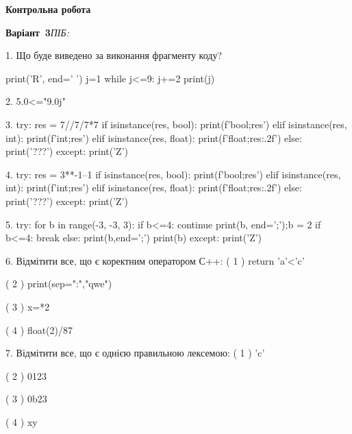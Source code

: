 \documentclass[11pt]{article}
\begin{document}
{\large\textbf{Контрольна робота}}

\textbf{Варіант \No\,3}\hfill \textit{ПІБ:}\,\underline{\hspace{60mm}}
\vspace{4mm}

1. Що буде виведено за виконання фрагменту коду?

print('R', end=' ')
j=1
while j<=9:
    j+=2
print(j)

\vspace{5mm}

2. 
5.0<="9.0j"\vspace{5mm}

3. 
try:
    res = 7//7/7*7
    if isinstance(res, bool):
        print(f'bool;{res}')
    elif isinstance(res, int):
        print(f'int;{res}')
    elif isinstance(res, float):
        print(f'float;{res:.2f}')
    else:
        print('???')
except:
    print('Z')
\vspace{5mm}

4. 
try:
    res = 3**-1--1
    if isinstance(res, bool):
        print(f'bool;{res}')
    elif isinstance(res, int):
        print(f'int;{res}')
    elif isinstance(res, float):
        print(f'float;{res:.2f}')
    else:
        print('???')
except:
    print('Z')
\vspace{5mm}

5. 
try:
    for b in range(-3, -3, 3):
        if b<=4:
            continue
        print(b, end=';');b = 2
        if b<=4:
            break
    else:
        print(b,end=';')
    print(b)
except:
    print('Z')
\vspace{5mm}

6. %
Відмітити все, що є коректним оператором С++:
( 1 ) return 'a'<'c'

( 2 ) print(sep=":","qwe")

( 3 ) x=*2

( 4 ) float(2)/87
\vspace{5mm}

7. %
Відмітити все, що є однією правильною лексемою:
( 1 ) 'c'

( 2 ) 0123

( 3 ) 0b23

( 4 ) xy
\vspace{5mm}
\end{document}
